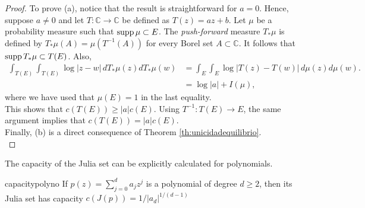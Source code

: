 \begin{proof}
To prove (a), notice that the result is straightforward for $a=0$. Hence, suppose $a\neq 0$ and let $T:\mathbb{C} \rightarrow \mathbb{C}$ be defined as $T(z) = az+b$. Let $\mu$ be a probability measure such that $\text{supp} \,\mu \subset E$. The {\it push-forward} measure $T_*\mu$ is defined by $T_*\mu(A) = \mu(T^{-1}(A))$ for every Borel set $A\subset \mathbb{C}$.  It follows that $\text{supp} \, T_*\mu \subset T(E)$. Also,
\begin{align*}
\int_{T(E)}\int_{T(E)} \log|z-w|\,dT_*\mu(z)dT_*\mu(w) &= \int_{E}\int_{E} \log|T(z)-T(w)| \,d\mu(z)d\mu(w).\\
&= \log|a|+I(\mu),
\end{align*}
where we have used that $\mu(E)=1$ in the last equality.\\

This shows that $c(T(E)) \geq |a|c(E)$. Using $T^{-1}:T(E)\rightarrow E$, the same argument implies that $c(T(E)) = |a|c(E)$.\\

Finally, (b) is a direct consequence of Theorem \ref{th:unicidadequilibrio}.\\

\end{proof}

The capacity of the Julia set can be explicitly calculated for polynomials.

\begin{mytheo}{}{capacitypolyno}
If $p(z) = \sum_{j=0}^da_jz^j$ is a polynomial of degree $d\geq 2$, then its Julia set has capacity $c(J(p)) = 1/|a_d|^{1/(d-1)}$
\end{mytheo}


